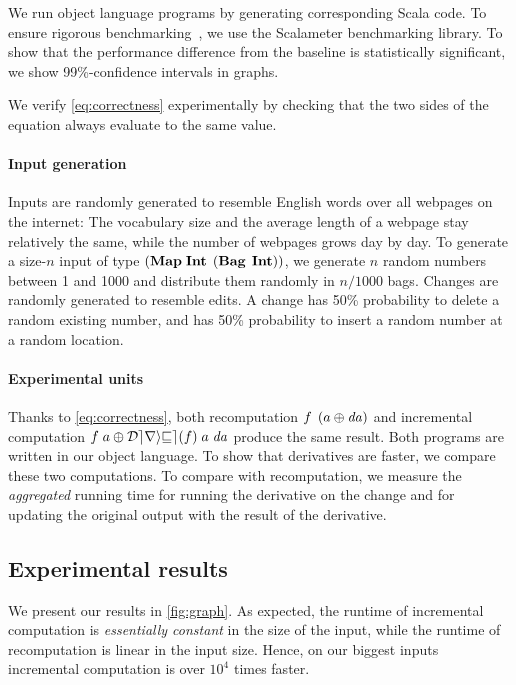 We run object language programs by generating corresponding Scala code.
To ensure rigorous
benchmarking~\citep{Georges07rigorousJavaPerformance}, we use the
Scalameter benchmarking library. To show that the performance
difference from the baseline is statistically significant, we
show 99\%-confidence intervals in graphs.

We verify \cref{eq:correctness} experimentally
by checking that the two sides of the equation always
evaluate to the same value.

\paragraph{Input generation}

Inputs are randomly generated to resemble English words over all
webpages on the internet: The vocabulary size and the average
length of a webpage stay relatively the same, while the number of
webpages grows day by day. To generate a size-$n$ input of type
$(\HashMap{\Int}{\Bag*[\Int]})$, we generate $n$ random numbers
between 1 and 1000 and distribute them randomly in $n/1000$ bags.
Changes are randomly generated to resemble edits. A change has
50\% probability to delete a random existing number, and has 50\%
probability to insert a random number at a random location.

\paragraph{Experimental units}

Thanks to \cref{eq:correctness}, both recomputation
$\App{f}{\Apply*{\D a}{a}}$ and incremental computation
$\Apply{\App{\App{\Derive{f}}{a}}{\D a}}{\App{f}{a}}$ produce
the same result. Both programs are written in our object language.
To show that derivatives are faster, we compare
these two computations. To compare with recomputation, we measure the
\emph{aggregated} running time for running the derivative on the change 
and for updating the original output with the result of the derivative.

\subsection{Experimental results}


We present our results in \cref{fig:graph}. As expected, the
runtime of incremental computation is
\emph{essentially constant} in the size of the input, while the runtime
of recomputation is linear in the input size.
Hence, on our biggest inputs incremental computation
is over $10^4$ times faster.

